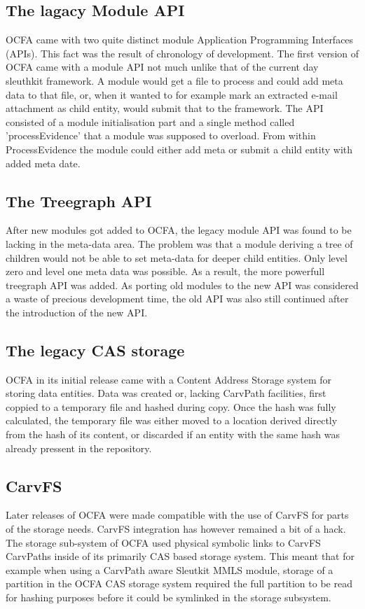 \subsection{The lagacy Module API}
OCFA came with two quite distinct module Application Programming Interfaces (APIs). This fact was the result of chronology of development. The first version of OCFA came with a module API not much unlike that of the current day sleuthkit framework. A module would get a file to process and could add meta data to that file, or, when it wanted to for example mark an extracted e-mail attachment as child entity, would submit that to the framework. The API consisted of a module initialisation part and a single method called 'processEvidence' that a module was supposed to overload. From within ProcessEvidence the module could either add meta or submit a child entity with added meta date.
\subsection{The Treegraph API}
After new modules got added to OCFA, the legacy module API was found to be lacking in the meta-data area. The problem was that a module deriving a tree of children would not be able to set meta-data for deeper child entities. Only level zero and level one meta data was possible. As a result, the more powerfull treegraph API was added. As porting old modules to the new API was considered a waste of precious development time, the old API was also still continued after the introduction of the new API.
\subsection{The legacy CAS storage}
OCFA in its initial release came with a Content Address Storage system for storing data entities. Data was created or, lacking CarvPath facilities, first coppied to a temporary file and hashed during copy. Once the hash was fully calculated, the temporary file was either moved to a location derived directly from the hash of its content, or discarded if an entity with the same hash was already pressent in the repository. 
\subsection{CarvFS}
Later releases of OCFA were made compatible with the use of CarvFS for parts of the storage needs. CarvFS integration has however remained a bit of a hack. The storage sub-system of OCFA used physical symbolic links to CarvFS CarvPaths inside of its primarily CAS based storage system. This meant that for example when using a CarvPath aware Sleutkit MMLS module, storage of a partition in the OCFA CAS storage system required the full partition to be read for hashing purposes before it could be symlinked in the storage subsystem.

